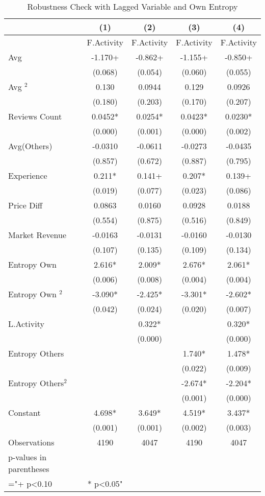 \begin{table}
\centering
\begin{tabular}{@{}lcccc@{}}
\toprule
 & (1) & (2) & (3) & (4) \\ \midrule
 & F.Activity & F.Activity & F.Activity & F.Activity \\
Avg & -1.170+ & -0.862+ & -1.155+ & -0.850+ \\
 & (0.068) & (0.054) & (0.060) & (0.055) \\
Avg $^2$ & 0.130 & 0.0944 & 0.129 & 0.0926 \\
 & (0.180) & (0.203) & (0.170) & (0.207) \\
Reviews Count & 0.0452* & 0.0254* & 0.0423* & 0.0230* \\
 & (0.000) & (0.001) & (0.000) & (0.002) \\
Avg(Others) & -0.0310 & -0.0611 & -0.0273 & -0.0435 \\
 & (0.857) & (0.672) & (0.887) & (0.795) \\
Experience & 0.211* & 0.141+ & 0.207* & 0.139+ \\
 & (0.019) & (0.077) & (0.023) & (0.086) \\
Price Diff & 0.0863 & 0.0160 & 0.0928 & 0.0188 \\
 & (0.554) & (0.875) & (0.516) & (0.849) \\
Market Revenue & -0.0163 & -0.0131 & -0.0160 & -0.0130 \\
 & (0.107) & (0.135) & (0.109) & (0.134) \\
Entropy Own & 2.616* & 2.009* & 2.676* & 2.061* \\
 & (0.006) & (0.008) & (0.004) & (0.004) \\
Entropy Own $^2$ & -3.090* & -2.425* & -3.301* & -2.602* \\
 & (0.042) & (0.024) & (0.020) & (0.007) \\
L.Activity &  & 0.322* &  & 0.320* \\
 &  & (0.000) &  & (0.000) \\
Entropy Others &  &  & 1.740* & 1.478* \\
 &  &  & (0.022) & (0.009) \\
Entropy Others$^2$ &  &  & -2.674* & -2.204* \\
 &  &  & (0.001) & (0.000) \\
Constant & 4.698* & 3.649* & 4.519* & 3.437* \\
 & (0.001) & (0.001) & (0.002) & (0.003) \\
Observations & 4190 & 4047 & 4190 & 4047 \\
p-values in parentheses &  &  &  &  \\
="+ p\textless{}0.10 & * p\textless{}0.05" &  &  &  \\ \bottomrule
\end{tabular}%
\caption{Robustness Check with Lagged Variable and Own Entropy}
\label{rob_addlag_withentself}
\end{table}